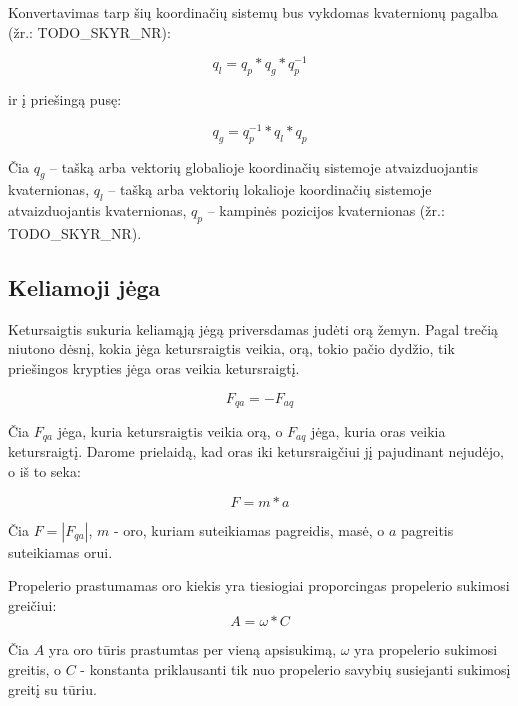 \documentclass[12pt, a4paper, lithuanian, final]{article}
\begin{document}
Konvertavimas tarp šių koordinačių sistemų bus vykdomas kvaternionų pagalba (žr.: TODO\_SKYR\_NR):

\begin{equation}
	q_{l} = q_{p} * q_{g} * q_{p}^{-1}
\end{equation}

ir į priešingą pusę:

\begin{equation}
	q_{g} = q_{p}^{-1} * q_{l} * q_{p}
\end{equation}

Čia $q_{g}$ -- tašką arba vektorių globalioje koordinačių sistemoje atvaizduojantis kvaternionas, $q_{l}$ -- tašką arba vektorių lokalioje koordinačių sistemoje atvaizduojantis kvaternionas, $q_{p}$ -- kampinės pozicijos kvaternionas (žr.: TODO\_SKYR\_NR).





\subsection{Keliamoji jėga}

Ketursaigtis sukuria keliamąją jėgą priversdamas judėti orą žemyn.
Pagal trečią niutono dėsnį, kokia jėga ketursraigtis veikia, orą, tokio pačio dydžio, tik priešingos krypties jėga oras veikia ketursraigtį.

\begin{equation}
	F_{qa} = -F_{aq}
\end{equation}

Čia $F_{qa}$ jėga, kuria ketursraigtis veikia orą, o $F_{aq}$ jėga, kuria oras veikia ketursraigtį.
Darome prielaidą, kad oras iki ketursraigčiui jį pajudinant nejudėjo, o iš to seka:

\begin{equation}
	F = m * a
\end{equation}

Čia $F = |F_{qa}|$, $m$ - oro, kuriam suteikiamas pagreidis, masė, o $a$ pagreitis suteikiamas orui.


Propelerio prastumamas oro kiekis yra tiesiogiai proporcingas propelerio sukimosi greičiui:
\begin{equation}
	A = \omega * C
\end{equation}

Čia $A$ yra oro tūris prastumtas per vieną apsisukimą, $\omega$ yra propelerio sukimosi greitis, o $C$ - konstanta priklausanti tik nuo propelerio savybių susiejanti sukimosį greitį su tūriu.
\end{document}
